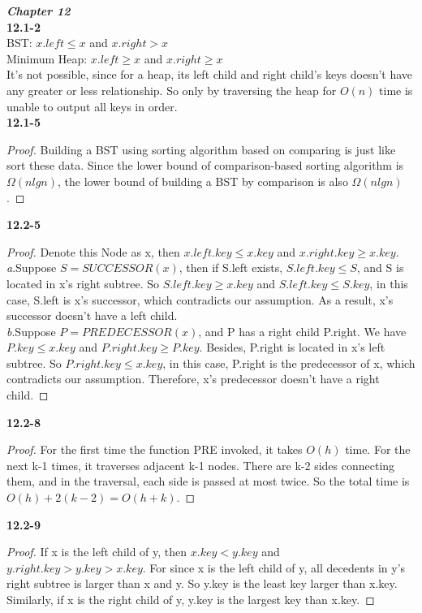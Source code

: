 \documentclass{article}
\author{Steven}
\date{\today}
\begin{document}
\setlength\parindent{0em}
\large\textbf{\emph{Chapter 12}}\\
\normalsize\textbf{12.1-2}\\
BST: $x.left\leq x$ and $x.right>x$\\
Minimum Heap: $x.left\geq x$ and $x.right\geq x$\\
It's not possible, since for a heap, its left child and right child's keys doesn't have any greater or less relationship. So only by traversing the heap for $O(n)$ time is unable to output all keys in order.\\
\textbf{12.1-5}
\begin{proof}
Building a BST using sorting algorithm based on comparing is just like sort these data. Since the lower bound of comparison-based sorting algorithm is $\Omega(nlgn)$, the lower bound of building a BST by comparison is also $\Omega(nlgn)$.
\end{proof}
\textbf{12.2-5}
\begin{proof}
Denote this Node as x, then $x.left.key\leq x.key$ and $x.right.key\geq x.key$.\\
\emph{a}.Suppose $S=SUCCESSOR(x)$, then if S.left exists, $S.left.key\leq S$, and S is located in x's right subtree. So $S.left.key\geq x.key$ and $S.left.key\leq S.key$, in this case, S.left is x's successor, which contradicts our assumption. As a result, x's successor doesn't have a left child.\\
\emph{b}.Suppose $P=PREDECESSOR(x)$, and P has a right child P.right. We have $P.key\leq x.key$ and $P.right.key\geq P.key$. Besides, P.right is located in x's left subtree. So $P.right.key\leq x.key$, in this case, P.right is the predecessor of x, which contradicts our assumption. Therefore, x's predecessor doesn't have a right child.
\end{proof}
\textbf{12.2-8}
\begin{proof}
For the first time the function PRE invoked, it takes $O(h)$ time. For the next k-1 times, it traverses adjacent k-1 nodes. There are k-2 sides connecting them, and in the traversal, each side is passed at most twice. So the total time is $O(h)+2(k-2)=O(h+k)$.
\end{proof}
\textbf{12.2-9}
\begin{proof}
If x is the left child of y, then $x.key<y.key$ and $y.right.key>y.key>x.key$.
For since x is the left child of y, all decedents in y's right subtree is larger than x and y. So y.key is the least key larger than x.key. Similarly, if x is the right child of y, y.key is the largest key than x.key.
\end{proof}
\end{document}
